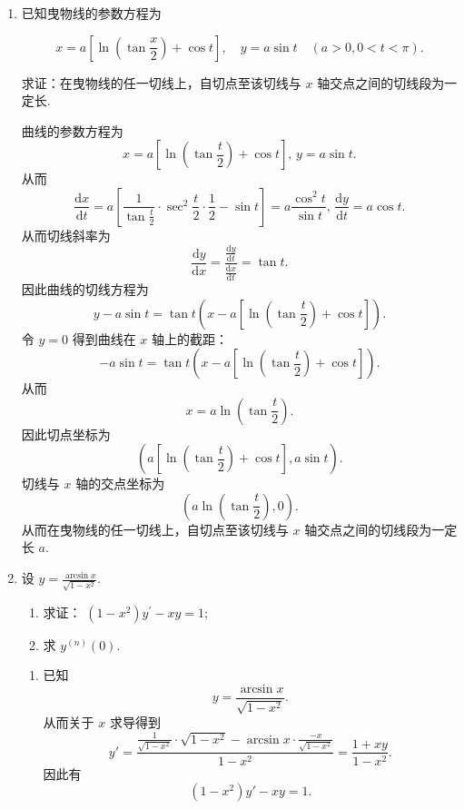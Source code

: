 \begin{enumerate}
    \item[11.]已知曳物线的参数方程为

    \[\displaystyle x = a\left[\ln \left(\tan \frac{x}{2}\right) + \cos t\right],\quad y = a\sin t\quad (a > 0,0< t< \pi).\]

    求证：在曳物线的任一切线上，自切点至该切线与 $x$ 轴交点之间的切线段为一定长.
    \begin{solution}
        曲线的参数方程为
        \[
        x=a\left[\ln\left(\tan{\frac{t}{2}}\right)+\cos t\right],\, y=a\sin t.
        \]
        从而
        \[
        \frac{\mathrm{d}x}{\mathrm{d}t}=a\left[\frac{1}{\tan{\frac{t}{2}}}\cdot \sec^2 \frac{t}{2}\cdot\frac{1}{2}-\sin t \right]=a\frac{\cos^2 t}{\sin t},\, \frac{\mathrm{d}y}{\mathrm{d}t}=a\cos t.
        \]
        从而切线斜率为
        \[
        \displaystyle\frac{\mathrm{d}y}{\mathrm{d}x}=\frac{\frac{\mathrm{d}y}{\mathrm{d}t}}{\frac{\mathrm{d}x}{\mathrm{d}t}}=\tan t.
        \]
        因此曲线的切线方程为
        \[
        y-a\sin t=\tan t(x-a\left[\ln\left(\tan{\frac{t}{2}}\right)+\cos t\right]).
        \]
        令 $y=0$ 得到曲线在 $x$ 轴上的截距：
        \[
        -a\sin t=\tan t(x-a\left[\ln\left(\tan{\frac{t}{2}}\right)+\cos t\right]).
        \]
        从而
        \[
        x=a\ln\left(\tan \frac{t}{2}\right).
        \]
        因此切点坐标为
        \[
        \left(a\left[\ln\left(\tan{\frac{t}{2}}\right)+\cos t\right],a\sin t\right).
        \]
        切线与 $x$ 轴的交点坐标为
        \[
        \left(a\ln\left(\tan \frac{t}{2}\right),0\right).
        \]
        从而在曳物线的任一切线上，自切点至该切线与 $x$ 轴交点之间的切线段为一定长 $a$.
    \end{solution}

    \item[12.]设 $\displaystyle y = \frac{\arcsin x}{\sqrt{1 - x^{2}}}$.
    \begin{enumerate}
        \item[(a)]求证： $\displaystyle(1 - x^{2})y^{\prime} - xy = 1$;
        \item[(b)]求 $y^{(n)}(0)$.
    \end{enumerate}
    \begin{solution}
        \begin{enumerate}
        \item[(a)] 
        已知
        \[
        y=\frac{\arcsin{x}}{\sqrt{1-x^2}}.
        \]
        从而关于 $x$ 求导得到
        \[
        y'=\frac{\frac{1}{\sqrt{1-x^2}}\cdot \sqrt{1-x^2}-\arcsin{x}\cdot\frac{-x}{\sqrt{1-x^2}}}{1-x^2}=\frac{1+xy}{1-x^2}.
        \]
        因此有
        \[
        (1-x^2)y'-xy=1.
        \]


\end{enumerate}
\end{solution}
\end{enumerate}
